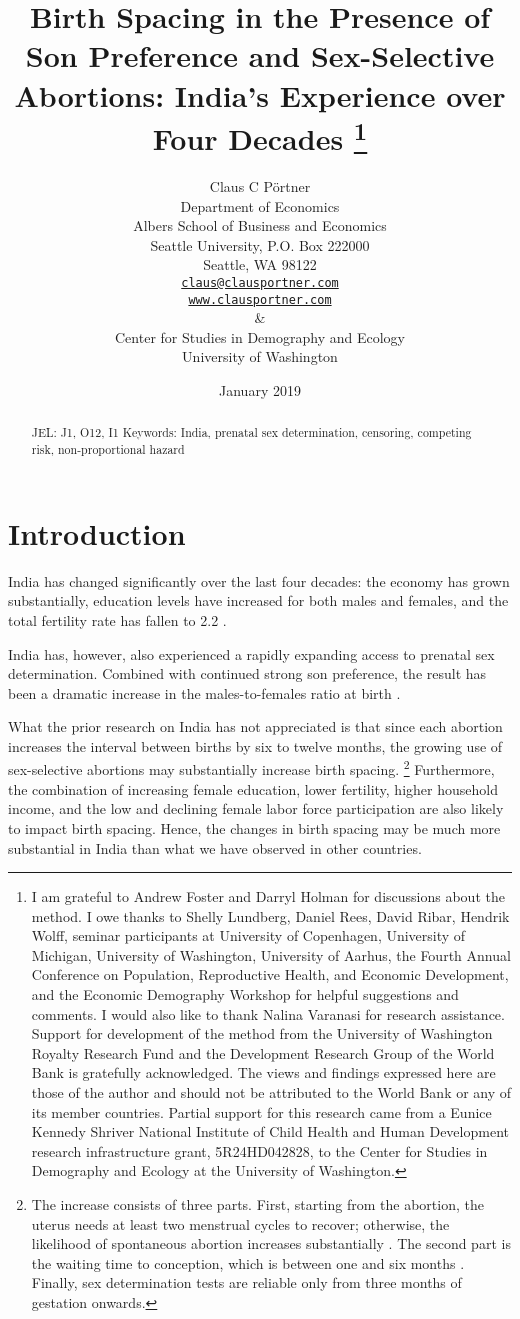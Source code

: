 \documentclass[12pt,letterpaper]{article}
\title{Birth Spacing in the Presence of Son Preference and Sex-Selective Abortions:
India's Experience over Four Decades%
\protect\thanks{%
I am grateful to Andrew Foster and Darryl Holman for discussions about the method.
I owe thanks to Shelly Lundberg, Daniel Rees, David Ribar, 
Hendrik Wolff, seminar participants at University of Copenhagen, University of Michigan, 
University of Washington, University of Aarhus, the Fourth 
Annual Conference on Population, Reproductive Health, 
and Economic Development, and the Economic Demography Workshop for helpful 
suggestions and comments.
I would also like to thank Nalina Varanasi for research assistance.
Support for development of the method from the University of Washington Royalty 
Research Fund and the Development Research Group of the World Bank is gratefully 
acknowledged.
The views and findings expressed here are those of the author and
should not be attributed to the World Bank or any of its member countries.
Partial support for this research came from a Eunice Kennedy Shriver National
Institute of Child Health and Human Development research infrastructure grant,
5R24HD042828, to the Center for Studies in Demography and Ecology at the
University of Washington.
}
}
\author{Claus C P\"ortner\\
    Department of Economics\\
    Albers School of Business and Economics\\
    Seattle University, P.O. Box 222000\\
    Seattle, WA 98122\\
    \href{mailto:claus@clausportner.com}{\texttt{claus@clausportner.com}}\\
    \href{http://www.clausportner.com}{\texttt{www.clausportner.com}}\\
    \& \\
    Center for Studies in Demography and Ecology \\
    University of Washington\\ \vspace{2cm}
    }
\date{January 2019}
\begin{document}
\graphicspath{{../figures/}}

\setcounter{page}{-1}
\maketitle
\thispagestyle{empty}



\newpage
\thispagestyle{empty}
\doublespacing

\begin{abstract}

\noindent 



\noindent JEL: J1, O12, I1
\noindent Keywords: India, prenatal sex determination, censoring, competing risk, non-proportional hazard
\end{abstract}

\newpage



\section{Introduction\label{sec:intro}}

India has changed significantly over the last four decades:
the economy has grown substantially,
education levels have increased for both males and females,
and the total fertility rate has fallen to 2.2 
\citep{Bosworth2008,Dharmalingam2014,
International-Institute-for-Population-Sciences-IIPS2017}.

India has, however, also experienced a rapidly expanding 
access to prenatal sex determination.
Combined with continued strong son preference, the result has been a dramatic 
increase in the males-to-females ratio at birth
\citep{das_gupta97,Arnold2002,retherford03b,Guilmoto2012,
Portner2015b,Jayachandran2017}.

What the prior research on India has not appreciated is that since each abortion 
increases the interval between births by six to twelve months, the growing use of 
sex-selective abortions may substantially increase birth spacing.%
\footnote{
The increase consists of three parts.
First, starting from the abortion, the uterus needs at 
least two menstrual cycles to recover;  otherwise, the likelihood 
of spontaneous abortion increases substantially \citep{zhou00b}.
The second part is the waiting time to conception, which is between 
one and six months \citep{Wang2003}.
Finally, sex determination tests are reliable only from three months 
of gestation onwards.
}
Furthermore, the combination of increasing female education, 
lower fertility, higher household income, and the low and declining female 
labor force participation are also likely to impact birth spacing.
Hence, the changes in birth spacing may be much more substantial in India 
than what we have observed in other countries.
\end{document}
